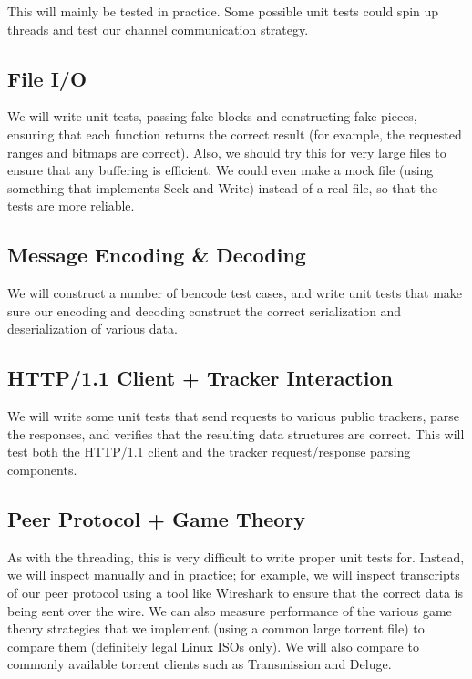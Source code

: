 \documentclass{article}
\begin{document}
    This will mainly be tested in practice.
    Some possible unit tests could spin up threads and test our channel communication strategy.

    \subsection{File I/O}

    We will write unit tests, passing fake blocks and constructing fake pieces, ensuring that each function returns the correct result (for example, the requested ranges and bitmaps are correct).
    Also, we should try this for very large files to ensure that any buffering is efficient.
    We could even make a mock file (using something that implements Seek and Write) instead of a real file, so that the tests are more reliable.

    \subsection{Message Encoding \& Decoding}

    We will construct a number of bencode test cases, and write unit tests that make sure our encoding and decoding construct the correct serialization and deserialization of various data.

    \subsection{HTTP/1.1 Client + Tracker Interaction}

    We will write some unit tests that send requests to various public trackers, parse the responses, and verifies that the resulting data structures are correct.
    This will test both the HTTP/1.1 client and the tracker request/response parsing components.

    \subsection{Peer Protocol + Game Theory}

    As with the threading, this is very difficult to write proper unit tests for.
    Instead, we will inspect manually and in practice; for example, we will inspect transcripts of our peer protocol using a tool like Wireshark to ensure that the correct data is being sent over the wire.
    We can also measure performance of the various game theory strategies that we implement (using a common large torrent file) to compare them (definitely legal Linux ISOs only).
    We will also compare to commonly available torrent clients such as Transmission and Deluge.
\end{document}
